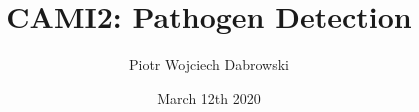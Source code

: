 \usepackage[utf8]{inputenc}
\usepackage[T1]{fontenc}
\usepackage[export]{adjustbox}
\usepackage{amssymb}
\usepackage{xcolor}
\usepackage{tikz}

\title{CAMI2: Pathogen Detection}
\date{March 12th 2020}
\author[PWD]{Piotr Wojciech Dabrowski}

\usepackage{HTWBeamerTemplate/beamerthemeHTW}
